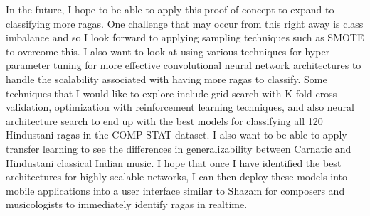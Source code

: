In the future, I hope to be able to apply this proof of concept to expand to classifying more ragas. One challenge that may occur from this right away is class imbalance and so I look forward to applying sampling techniques such as SMOTE to overcome this. I also want to look at using various techniques for hyper-parameter tuning for more effective convolutional neural network architectures to handle the scalability associated with having more ragas to classify. Some techniques that I would like to explore include grid search with K-fold cross validation, optimization with reinforcement learning techniques, and also neural architecture search to end up with the best models for classifying all 120 Hindustani ragas in the COMP-STAT dataset. I also want to be able to apply transfer learning to see the differences in generalizability between Carnatic and Hindustani classical Indian music. I hope that once I have identified the best architectures for highly scalable networks, I can then deploy these models into mobile applications into a user interface similar to Shazam for composers and musicologists to immediately identify ragas in realtime. 

